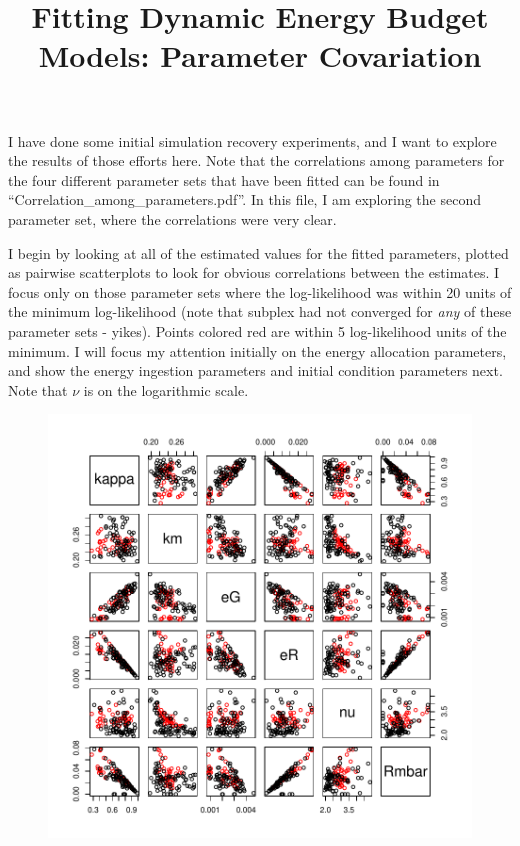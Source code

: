 \documentclass[12pt,reqno,final]{amsart}
\title[DEB fitting notes]{Fitting Dynamic Energy Budget Models:
  Parameter Covariation}
\theoremstyle{plain}
\numberwithin{equation}{part}
\begin{document}
\maketitle

I have done some initial simulation recovery experiments, and I want
to explore the results of those efforts here. Note that the
correlations among parameters for the four different parameter sets
that have been fitted can be found in
``Correlation\_among\_parameters.pdf''. In this file, I am exploring
the second parameter set, where the correlations were very clear.

I begin by looking at all of the estimated values for the fitted
parameters, plotted as pairwise scatterplots to look for obvious
correlations between the estimates. I focus only on those parameter
sets where the log-likelihood was within 20 units of the minimum
log-likelihood (note that subplex had not converged for \emph{any} of
these parameter sets - yikes). Points colored red are within 5
log-likelihood units of the minimum. I will focus my attention
initially on the energy allocation parameters, and show the energy
ingestion parameters and initial condition parameters next. Note that
$\nu$ is on the logarithmic scale.
\begin{figure}
\includegraphics{Solving_the_problem_of_parameter_covariation_2-001}
\end{figure}
\end{document}
